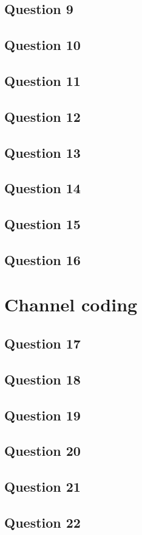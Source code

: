 \documentclass[]{template}
\begin{document}
    \subsection{Question 9}

    \subsection{Question 10}

    \subsection{Question 11}

    \subsection{Question 12}

    \subsection{Question 13}

    \subsection{Question 14}

    \subsection{Question 15}

    \subsection{Question 16}

\section{Channel coding}

    \subsection{Question 17}

    \subsection{Question 18}

    \subsection{Question 19}

    \subsection{Question 20}

    \subsection{Question 21}

    \subsection{Question 22}
\end{document}
